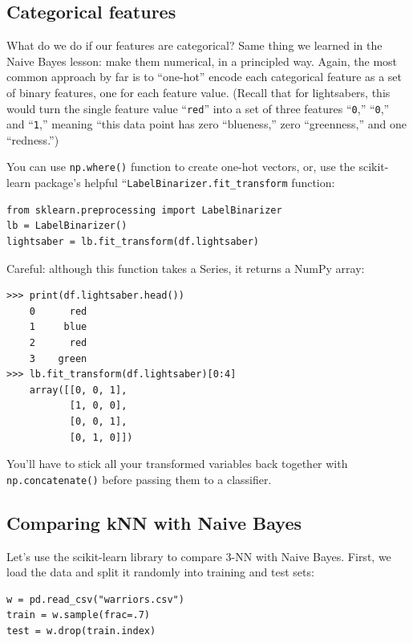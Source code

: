 \subsection{Categorical features}

What do we do if our features are categorical? Same thing we learned in the
Naive Bayes lesson: make them numerical, in a principled way. Again, the most
common approach by far is to ``one-hot'' encode each categorical feature as a
set of binary features, one for each feature value. (Recall that for
lightsabers, this would turn the single feature value ``\texttt{red}'' into a
set of three features ``\texttt{0},'' ``\texttt{0},'' and ``\texttt{1},'' meaning
``this data point has zero ``blueness,'' zero ``greenness,'' and one
``redness.'')

You can use \texttt{np.where()} function to create one-hot vectors, or, use
the scikit-learn package's helpful ``\texttt{LabelBinarizer.fit\_transform}
function:

\begin{Verbatim}[fontsize=\small,samepage=true,frame=single]
from sklearn.preprocessing import LabelBinarizer
lb = LabelBinarizer()
lightsaber = lb.fit_transform(df.lightsaber)
\end{Verbatim}
\normalsize

Careful: although this function takes a Series, it returns a NumPy array:

\begin{Verbatim}[fontsize=\small,samepage=true,frame=single]
>>> print(df.lightsaber.head())
    0      red
    1     blue
    2      red
    3    green
>>> lb.fit_transform(df.lightsaber)[0:4]
    array([[0, 0, 1],
           [1, 0, 0],
           [0, 0, 1],
           [0, 1, 0]])
\end{Verbatim}
\normalsize

You'll have to stick all your transformed variables back together with
\texttt{np.concatenate()} before passing them to a classifier.

\subsection{Comparing kNN with Naive Bayes}

Let's use the scikit-learn library to compare 3-NN with Naive Bayes. First, we
load the data and split it randomly into training and test sets:

\begin{Verbatim}[fontsize=\footnotesize,samepage=true,frame=single]
w = pd.read_csv("warriors.csv")
train = w.sample(frac=.7)
test = w.drop(train.index)
\end{Verbatim}
\normalsize

